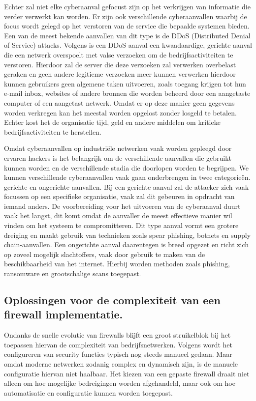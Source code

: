 Echter zal niet elke cyberaanval gefocust zijn op het verkrijgen van informatie die verder verwerkt kan worden. Er zijn ook verschillende cyberaanvallen waarbij de focus wordt gelegd op het verstoren van de service die bepaalde systemen bieden. Een van de meest bekende aanvallen van dit type is de DDoS (Distributed Denial of Service) attacks. Volgens \textcite{Baker2024} is een DDoS aanval een kwaadaardige, gerichte aanval die een netwerk overspoelt met valse verzoeken om de bedrijfsactiviteiten te verstoren. Hierdoor zal de server die deze verzoeken zal verwerken overbelast geraken en geen andere legitieme verzoeken meer kunnen verwerken hierdoor kunnen gebruikers geen algemene taken uitvoeren, zoals toegang krijgen tot hun e-mail inbox, websites of andere bronnen die worden beheerd door een aangetaste computer of een aangetast netwerk. Omdat er op deze manier geen gegevens worden verkregen kan het meestal worden opgelost zonder losgeld te betalen. Echter kost het de organisatie tijd, geld en andere middelen om kritieke bedrijfsactiviteiten te herstellen.

Omdat cyberaanvallen op industriële netwerken vaak worden gepleegd door ervaren hackers is het belangrijk om de verschillende aanvallen die gebruikt kunnen worden en de verschillende stadia die doorlopen worden te begrijpen. We kunnen verschillende cyberaanvallen vaak gaan onderbrengen in twee categorieën. gerichte en ongerichte aanvallen. Bij een gerichte aanval zal de attacker zich vaak focussen op een specifieke organisatie, vaak zal dit gebeuren in opdracht van iemand anders. De voorbereiding voor het uitvoeren van de cyberaanval duurt vaak het langst, dit komt omdat de aanvaller de meest effectieve manier wil vinden om het systeem te compromitteren. Dit type aanval vormt een grotere dreiging en maakt gebruik van technieken zoals spear phishing, botnets en supply chain-aanvallen. Een ongerichte aanval daarentegen is breed opgezet en richt zich op zoveel mogelijk slachtoffers, vaak door gebruik te maken van de beschikbaarheid van het internet. Hierbij worden methoden zoals phishing, ransomware en grootschalige scans toegepast. \autocite{biju2019}

\subsection{Oplossingen voor de complexiteit van een firewall implementatie.}

Ondanks de snelle evolutie van firewalls blijft een groot struikelblok bij het toepassen hiervan de complexiteit van bedrijfsnetwerken. Volgens \textcite{Bringhenti2023} wordt het configureren van security functies typisch nog steeds manueel gedaan. Maar omdat moderne netwerken zodanig complex en dynamisch zijn, is de manuele configuratie hiervan niet haalbaar. Het kiezen van een gepaste firewall draait niet alleen om hoe mogelijke bedreigingen worden afgehandeld, maar ook om hoe automatisatie en configuratie kunnen worden toegepast.

